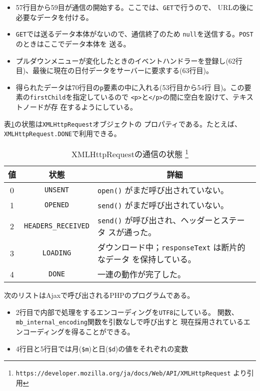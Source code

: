 \begin{Exec}
\begin{itemize}
 \item 57行目から59目が通信の開始する。ここでは、\texttt{GET}で行うので、
       URLの後に必要なデータを付ける。
 \item \texttt{GET}では送るデータ本体がないので、通信終了のため
       \texttt{null}を送信する。\texttt{POST}のときはここでデータ本体を
       送る。
 \item プルダウンメニューが変化したときのイベントハンドラーを登録し(62行
       目)、最後に現在の日付データをサーバーに要求する(63行目)。
 \item 得られたデータは70行目の\texttt{p}要素の中に入れる(53行目から54行
       目)。この要素の\texttt{firstChild}を指定しているので
       \texttt{<p>}と\texttt{</p>}の間に空白を設けて、テキストノードが存
       在するようにしている。
\end{itemize}
 表\ref{XMLHttpRequestRes}の状態は\texttt{XMLHttpRequest}オブジェクトの
 プロパティである。たとえば、\texttt{XMLHttpRequest.DONE}で利用できる。
 \begin{table}[ht]
	\caption{XMLHttpRequestの通信の状態
\protect\footnote{\protect\texttt{https://developer.mozilla.org/ja/docs/Web/API/XMLHttpRequest}
	より引用}} \label{XMLHttpRequestRes}
		\begin{tabular}{|c|c|m{}|}\hline
		 値&状態&\multicolumn{1}{c|}{詳細}\\\hline
		 0&\Verb+UNSENT+&\Verb+open()+ がまだ呼び出されていない。\\\hline
1&\Verb+OPENED+&\Verb+send()+ がまだ呼び出されていない。\\\hline
2&\Verb+HEADERS_RECEIVED+&\Verb+send()+ が呼び出され、ヘッダーとステータ
						 スが通った。\\\hline 
3&\Verb+LOADING+&ダウンロード中；\Verb+responseText+ は断片的なデータ
						 を保持している。\\\hline 
4&\Verb+DONE+&一連の動作が完了した。\\\hline
		\end{tabular}
 \end{table}

 次のリストはAjaxで呼び出されるPHPのプログラムである。
\begin{itemize}
 \item 2行目で内部で処理をするエンコーディングを\texttt{UTF8}にしている。
       関数、\texttt{mb\_internal\_encoding}関数を引数なしで呼び出すと
       現在採用されているエンコーディングを得ることができる。
 \item 4行目と5行目では月(\Verb+$m+)と日(\Verb+$d+)の値をそれぞれの変数

\end{itemize}
\end{Exec}
